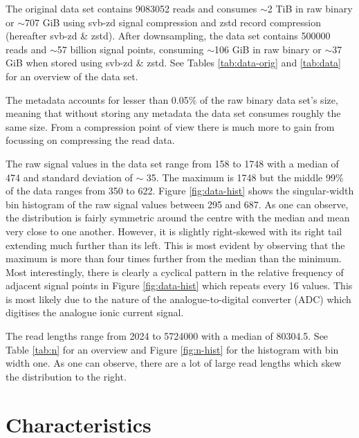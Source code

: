 The original data set contains \num{9083052} reads and consumes $\sim$2 TiB in raw binary or $\sim$707 GiB using svb-zd signal compression and zstd record compression (hereafter svb-zd \& zstd)\cite{slow5}. After downsampling, the data set contains \num{500000} reads and $\sim$57 billion signal points, consuming $\sim$106 GiB in raw binary or $\sim$37 GiB when stored using svb-zd \& zstd. See Tables \ref{tab:data-orig} and \ref{tab:data} for an overview of the data set.




The metadata accounts for lesser than 0.05\% of the raw binary data set's size, meaning that without storing any metadata the data set consumes roughly the same size. From a compression point of view there is much more to gain from focussing on compressing the read data.

The raw signal values in the data set range from 158 to 1748 with a median of 474 and standard deviation of $\sim$ 35. The maximum is 1748 but the middle 99\% of the data ranges from 350 to 622. Figure \ref{fig:data-hist} shows the singular-width bin histogram of the raw signal values between 295 and 687.
As one can observe, the distribution is fairly symmetric around the centre with the median and mean very close to one another. However, it is slightly right-skewed with its right tail extending much further than its left. This is most evident by observing that the maximum is more than four times further from the median than the minimum.
Most interestingly, there is clearly a cyclical pattern in the relative frequency of adjacent signal points in Figure \ref{fig:data-hist} which repeats every 16 values.
This is most likely due to the nature of the analogue-to-digital converter (ADC) which digitises the analogue ionic current signal.




The read lengths range from 2024 to \num{5724000} with a median of 80304.5. See Table \ref{tab:n} for an overview and Figure \ref{fig:n-hist} for the histogram with bin width one. As one can observe, there are a lot of large read lengths which skew the distribution to the right.




\section{Characteristics}

